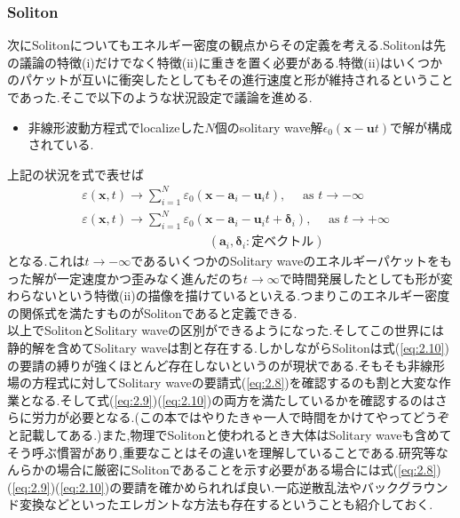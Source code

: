 \documentclass[dvipdfmx,11pt,a4paper,oneside,openany]{jsbook}
\begin{document}
\subsubsection{Soliton}
次にSolitonについてもエネルギー密度の観点からその定義を考える.Solitonは先の議論の特徴(i)だけでなく特徴(ii)に重きを置く必要がある.特徴(ii)はいくつかのパケットが互いに衝突したとしてもその進行速度と形が維持されるということであった.そこで以下のような状況設定で議論を進める.
\begin{itemize}
    \item 非線形波動方程式でlocalizeした$N$個のsolitary wave解$\epsilon_0(\bm{x}-\bm{u}t)$で解が構成されている.
\end{itemize}
上記の状況を式で表せば
\begin{align}
     & \varepsilon(\bm{x}, t) \rightarrow \sum_{i=1}^{N} \varepsilon_{0}\left(\bm{x}-\bm{a}_{i}-\bm{u}_{i} t\right), \quad \text { as } t \rightarrow-\infty\label{eq:2.9}                  \\
     & \varepsilon(\bm{x}, t) \rightarrow \sum_{i=1}^{N} \varepsilon_{0}\left(\bm{x}-\bm{a}_{i}-\bm{u}_{i} t+\bm{\delta}_{i}\right), \quad \text { as } t \rightarrow+\infty\label{eq:2.10} \\
     & \qquad \ \ \ \ \ \ \ \ \ \ \ \ \ \ \ \ \ \ \ \ \  \ \ \ \ \ \ \ \ \ \ \ \ \ \ \ \ (\bm{a}_i,\bm{\delta}_i:\text{定ベクトル})\nonumber
\end{align}
となる.これは$t\rightarrow -\infty$であるいくつかのSolitary waveのエネルギーパケットをもった解が一定速度かつ歪みなく進んだのち$t\rightarrow \infty$で時間発展したとしても形が変わらないという特徴(ii)の描像を描けているといえる.つまりこのエネルギー密度の関係式を満たすものがSolitonであると定義できる.\\

以上でSolitonとSolitary waveの区別ができるようになった.そしてこの世界には静的解を含めてSolitary waveは割と存在する.しかしながらSolitonは式(\ref{eq:2.10})の要請の縛りが強くほとんど存在しないというのが現状である.そもそも非線形場の方程式に対してSolitary waveの要請式(\ref{eq:2.8})を確認するのも割と大変な作業となる.そして式(\ref{eq:2.9})(\ref{eq:2.10})の両方を満たしているかを確認するのはさらに労力が必要となる.(この本ではやりたきゃ一人で時間をかけてやってどうぞと記載してある.)また,物理でSolitonと使われるとき大体はSolitary waveも含めてそう呼ぶ慣習があり,重要なことはその違いを理解していることである.研究等なんらかの場合に厳密にSolitonであることを示す必要がある場合には式(\ref{eq:2.8})(\ref{eq:2.9})(\ref{eq:2.10})の要請を確かめられれば良い.一応逆散乱法やバックグラウンド変換などといったエレガントな方法も存在するということも紹介しておく.
\end{document}
